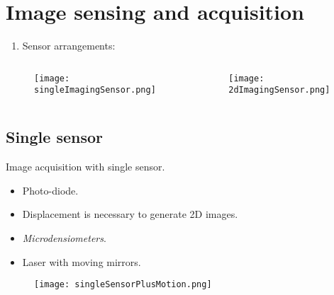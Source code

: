 
\section{Image sensing and acquisition}


\begin{frame}
\begin{enumerate}
\item Sensor arrangements:
\end{enumerate}
\begin{columns}
\begin{column}{.7\textwidth}
\begin{figure}
\texttt{[image: singleImagingSensor.png]}
\end{figure}
\end{column}
\begin{column}{.3\textwidth}
\begin{figure}
\texttt{[image: 2dImagingSensor.png]}
\end{figure}
\end{column}
\end{columns}
\end{frame}


\subsection{Single sensor}


\begin{frame}
Image acquisition with single sensor.
\begin{itemize}
\item Photo-diode.
\item Displacement is necessary to generate 2D images.
\item \textit{Microdensiometers}.
\item Laser with moving mirrors.
\end{itemize}
\begin{figure}
\texttt{[image: singleSensorPlusMotion.png]}
\end{figure}
\end{frame}

